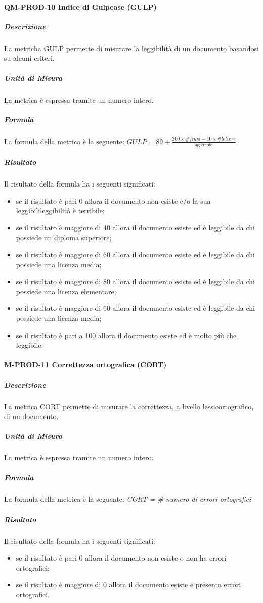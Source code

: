 		\paragraph{QM-PROD-10 Indice di Gulpease (GULP)}
			\subparagraph{Descrizione}
				La metricha GULP permette di misurare la leggibilità di un documento basandosi su alcuni criteri.
			\subparagraph{Unità di Misura}
				La metrica è espressa tramite un numero intero.
			\subparagraph{Formula}
				La formula della metrica è la seguente:
				\(
					GULP = 89+\frac{300\times\# frasi-10\times\#lettere}{\#parole}
				\)
			\subparagraph{Risultato}
				Il risultato della formula ha i seguenti significati:
				\begin{itemize}
					\item se il risultato è pari 0 allora il documento non esiste e/o la sua leggibilileggibilità è terribile;
					\item se il risultato è maggiore di 40 allora il documento esiste ed è leggibile da chi possiede un diploma superiore;
					\item se il risultato è maggiore di 60 allora il documento esiste ed è leggibile da chi possiede una licenza media;
					\item se il risultato è maggiore di 80 allora il documento esiste ed è leggibile da chi possiede una licenza elementare;
					\item se il risultato è maggiore di 60 allora il documento esiste ed è leggibile da chi possiede una licenza media;
					\item se il risultato è pari a 100 allora il documento esiste ed è molto più che leggibile.
				\end{itemize}
		\paragraph{M-PROD-11 Correttezza ortografica (CORT)}
			\subparagraph{Descrizione}
			La metrica CORT permette di misurare la correttezza, a livello lessicortografico, di un documento.
			\subparagraph{Unità di Misura}
				La metrica è espressa tramite un numero intero.
			\subparagraph{Formula}
				La formula della metrica è la seguente:
				\textit{CORT = \# numero di errori ortografici}
			\subparagraph{Risultato}
				Il risultato della formula ha i seguenti significati:
				\begin{itemize}
					\item se il risultato è pari 0 allora il documento non esiste o non ha errori ortografici;
					\item se il risultato è maggiore di 0 allora il documento esiste e presenta errori ortografici.
				\end{itemize}

